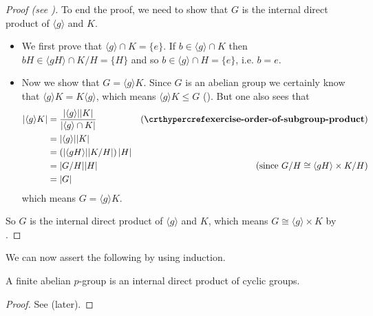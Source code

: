 \begin{proof}[Proof (see {\cite[Lemma 13.9]{judson_beezer_2022}})]
    To end the proof, we need to show that $G$ is the internal direct product of $\langle g\rangle$ and $K$.
    \begin{itemize}
        \item We first prove that $\langle g\rangle \cap K = \{e\}$. If $b \in \langle g\rangle \cap K$ then $bH \in \langle gH\rangle \cap K/H = \{H\}$ and so $b \in \langle g \rangle \cap H = \{e\}$, i.e. $b = e$.
        
        \item Now we show that $G = \langle g\rangle K$. Since $G$ is an abelian group we certainly know that $\langle g\rangle K = K\langle g\rangle$, which means $\langle g\rangle K \leq G$ (). But one also sees that
        \begin{align*}
            |\langle g\rangle K| &= \frac{|\langle g\rangle||K|}{|\langle g\rangle \cap K|} & (\myref{exercise-order-of-subgroup-product})\\
            &= |\langle g\rangle||K|\\
            &= \left(|\langle gH \rangle||K/H|\right)|H|\\
            &= |G/H||H| & (\text{since }G/H \cong \langle gH \rangle \times K/H)\\
            &= |G|
        \end{align*}
        which means $G = \langle g\rangle K$.
    \end{itemize}
    So $G$ is the internal direct product of $\langle g\rangle$ and $K$, which means $G \cong \langle g\rangle \times K$ by .
\end{proof}

We can now assert the following by using induction.
\begin{lemma}\label{lemma-fundamental-theorem-of-finite-abelian-groups-3}
    A finite abelian $p$-group is an internal direct product of cyclic groups.
\end{lemma}
\begin{proof}
    See  (later).
\end{proof}

